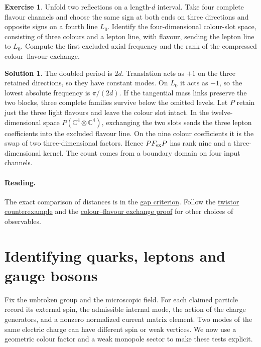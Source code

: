 \documentclass[10pt]{article}
\theoremstyle{definition}
\newtheorem{exercise}{Exercise}
\newtheorem{solution}{Solution}
\begin{document}
\begin{exercise}
Unfold two reflections on a length-\(d\) interval. Take four complete flavour channels and choose the same sign at both ends on three directions and opposite signs on a fourth line \(L_0\). Identify the four-dimensional colour-slot space, consisting of three colours and a lepton line, with flavour, sending the lepton line to \(L_0\). Compute the first excluded axial frequency and the rank of the compressed colour--flavour exchange.
\end{exercise}

\begin{solution}
The doubled period is \(2d\). Translation acts as \(+1\) on the three retained directions, so they have constant modes. On \(L_0\) it acts as \(-1\), so the lowest absolute frequency is \(\pi/(2d)\). If the tangential mass links preserve the two blocks, three complete families survive below the omitted levels. Let \(P\) retain just the three light flavours and leave the colour slot intact. In the twelve-dimensional space \(P(\mathbb C^4\otimes\mathbb C^4)\), exchanging the two slots sends the three lepton coefficients into the excluded flavour line. On the nine colour coefficients it is the swap of two three-dimensional factors. Hence \(P F_{\rm ex}P\) has rank nine and a three-dimensional kernel. The count comes from a boundary domain on four input channels.
\end{solution}

\paragraph{Reading.} The exact comparison of distances is in the \href{https://github.com/arivero/conneskk/blob/master/results/15_gap_criterion.md}{gap criterion}. Follow the \href{https://github.com/arivero/conneskk/blob/master/results/28_counterexample_generation_discontinuous.md}{twistor counterexample} and the \href{https://github.com/arivero/conneskk/blob/master/paper/two_endpoint_limits.tex}{colour--flavour exchange proof} for other choices of observables.

\section{Identifying quarks, leptons and gauge bosons}

Fix the unbroken group and the microscopic field. For each claimed particle record its external spin, the admissible internal mode, the action of the charge generators, and a nonzero normalized current matrix element. Two modes of the same electric charge can have different spin or weak vertices. We now use a geometric colour factor and a weak monopole sector to make these tests explicit.
\end{document}
